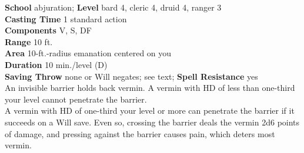 \textbf{School} abjuration; \textbf{Level} bard 4, cleric 4, druid 4, ranger 3\\
\textbf{Casting Time} 1 standard action\\
\textbf{Components} V, S, DF\\
\textbf{Range} 10 ft.\\
\textbf{Area} 10-ft.-radius emanation centered on you\\
\textbf{Duration} 10 min./level (D)\\
\textbf{Saving Throw} none or Will negates; see text; \textbf{Spell Resistance} yes\\
An invisible barrier holds back vermin. A vermin with HD of less than one-third your level cannot penetrate the barrier.\\
A vermin with HD of one-third your level or more can penetrate the barrier if it succeeds on a Will save. Even so, crossing the barrier deals the vermin 2d6 points of damage, and pressing against the barrier causes pain, which deters most vermin.\\
